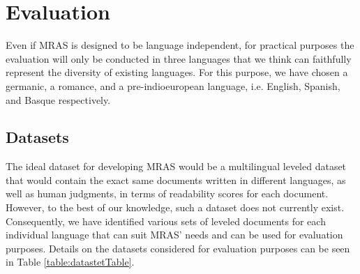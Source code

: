 \documentclass[12pt]{article}
\begin{document}

\section{Evaluation}

Even if MRAS is designed to be language independent, for practical purposes the evaluation will only be conducted in three languages that we think can faithfully represent the diversity of existing languages. For this purpose, we have chosen a germanic, a romance, and a pre-indioeuropean language, i.e. English, Spanish, and Basque respectively.


\subsection{Datasets}
The ideal dataset for developing MRAS would be a multilingual leveled dataset that would contain the exact same documents written in different languages, as well as human judgments, in terms of readability scores for each document. However, to the best of our knowledge, such a dataset does not currently exist. Consequently, we have identified various sets of leveled documents for each individual language that can suit MRAS' needs and can be used for evaluation purposes. Details on the datasets considered for evaluation purposes can be seen in Table \ref{table:datastetTable}.
\end{document}
